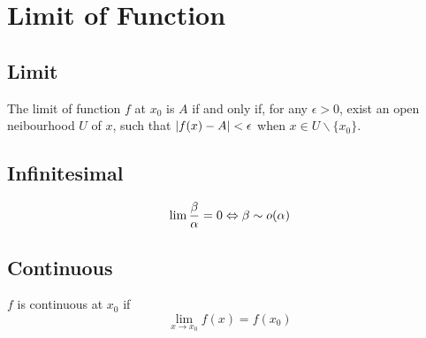 \section{Limit of Function}

\subsection{Limit}
The limit of function $f$ at $x_0$ is $A$ if and only if,
for any $\epsilon > 0$, exist an open neibourhood $U$ of $x$,
such that ${\left| {f(x) - A} \right|} < \epsilon$ when $x \in U \backslash \{x_0\}$.

\subsection{Infinitesimal}
$$\lim {\beta \over \alpha} = 0 \Leftrightarrow \beta \sim o(\alpha)$$


\subsection{Continuous}
$f$ is continuous at $x_0$ if $$\lim_{x \to x_0} f(x) = f(x_0)$$
